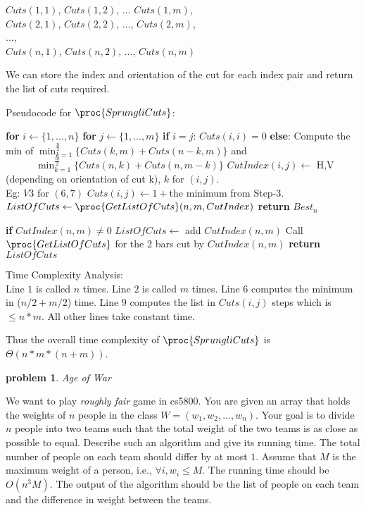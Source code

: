 \documentclass[11pt]{article}
\newtheorem{problem}{\sc\color{cit}problem}
\begin{document}
\begin{enumerate}
$Cuts(1,1)$, $Cuts(1,2)$, ... $Cuts(1,m)$,\\
$Cuts(2,1)$, $Cuts(2,2)$, ..., $Cuts(2,m)$,\\
...,\\
$Cuts(n,1)$, $Cuts(n,2)$, ..., $Cuts(n,m)$

We can store the index and orientation of the cut for each index pair and return the list of cuts required.

Pseudocode for $\proc{SprungliCuts}$:
 \begin{codebox}
\li \textbf{for} $i \leftarrow \{1, ..., n\}$
\li \quad \textbf{for} $j \leftarrow \{1, ..., m\}$
\li \quad \quad \textbf{if} $i=j$:
\li \quad \quad \quad $Cuts(i,i) = 0$
\li \quad \quad \textbf{else}:
\li \quad \quad \quad Compute the min of $\min_{k=1}^{\frac{n}{2}} \{Cuts(k,m) + Cuts(n-k,m)\}$ and\\ $\quad\quad\quad  \min_{k=1}^{\frac{m}{2}} \{Cuts(n,k) + Cuts(n,m-k)\}$
\li \quad\quad \quad $CutIndex(i,j) \leftarrow$ {H,V} (depending on orientation of cut k), $k$ for $(i,j)$.\\ \quad\quad\quad\quad\quad   Eg: $V3$ for $(6,7)$
\li \quad\quad\quad $Cuts(i,j) \leftarrow 1+$the minimum from Step-$3$.
\li $ListOfCuts \leftarrow \proc{GetListOfCuts}(n,m,CutIndex)$
\li \textbf{return} $Best_n$
\end{codebox}

\begin{codebox}
\li \textbf{if} $CutIndex(n,m) \neq 0$
\li \quad $ListOfCuts \leftarrow $ add $CutIndex(n,m)$
\li Call $\proc{GetListOfCuts}$ for the 2 bars cut by $CutIndex(n,m)$
\li \textbf{return} $ListOfCuts$ 
\end{codebox}

Time Complexity Analysis:\\
Line $1$ is called $n$ times. Line $2$ is called $m$ times. Line $6$ computes the minimum in ($n/2+m/2$) time. Line $9$ computes the list in $Cuts(i,j)$ steps which is $\leq n*m$. All other lines take constant time. 

Thus the overall time complexity of $\proc{SprungliCuts}$ is $\Theta(n*m*(n+m))$.

\end{enumerate}

\newpage

\begin{problem}{Age of War}\end{problem}
We want to play {\em roughly fair} game in cs5800.  
You are given an array that holds the weights of $n$ people in the class  $W=(w_1,w_2,\ldots,w_n)$.  Your goal is to divide $n$ people into two teams such that the total weight of the two teams is as close as possible to equal.  Describe such an algorithm and give its running time.  The total number of people on each team should differ by at most $1$.  Assume that $M$ is the maximum weight of a person, i.e., $\forall i, w_i\leq M$.   The running time should be $O(n^3M)$.  The output of the algorithm should be the list of people on each team and the difference in weight between the teams.
\end{document}
